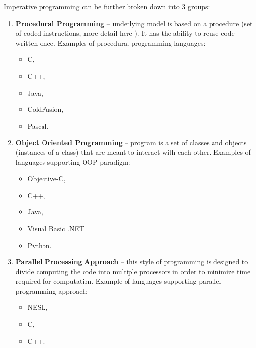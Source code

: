     Imperative programming can be further broken down into 3 groups:
    \begin{enumerate}
        \item \textbf{Procedural Programming} -- underlying model is based on a procedure (set of coded instructions, more detail here \cite{procedureDefinition}). It has the ability to reuse code written once. Examples of procedural programming languages:
            \begin{itemize}
                \item C,
                \item C++,
                \item Java,
                \item ColdFusion,
                \item Pascal.
            \end{itemize}
        \item \textbf{Object Oriented Programming} -- program is a set of classes and objects (instances of a class) that are meant to interact with each other. Examples of languages supporting OOP paradigm:
            \begin{itemize}
                \item Objective-C,
                \item C++,
                \item Java,
                \item Visual Basic .NET,
                \item Python.
            \end{itemize}
        \item \textbf{Parallel Processing Approach} -- this style of programming is designed to divide computing the code into multiple processors in order to minimize time required for computation. Example of languages supporting parallel programming approach:
            \begin{itemize}
                \item NESL,
                \item C,
                \item C++.
            \end{itemize}
    \end{enumerate}
    
